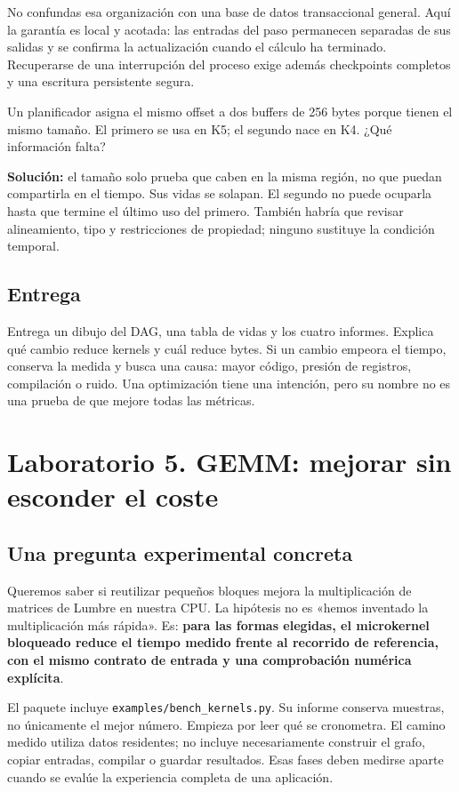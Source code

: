 \documentclass[12pt,a4paper,oneside]{report}
\begin{document}
No confundas esa organización con una base de datos transaccional general. Aquí la garantía es local y acotada: las entradas del paso permanecen separadas de sus salidas y se confirma la actualización cuando el cálculo ha terminado. Recuperarse de una interrupción del proceso exige además checkpoints completos y una escritura persistente segura.

\begin{practica}
Un planificador asigna el mismo offset a dos buffers de 256 bytes porque tienen el mismo tamaño. El primero se usa en K5; el segundo nace en K4. ¿Qué información falta?

\textbf{Solución:} el tamaño solo prueba que caben en la misma región, no que puedan compartirla en el tiempo. Sus vidas se solapan. El segundo no puede ocuparla hasta que termine el último uso del primero. También habría que revisar alineamiento, tipo y restricciones de propiedad; ninguno sustituye la condición temporal.

\end{practica}
\section{Entrega}
Entrega un dibujo del DAG, una tabla de vidas y los cuatro informes. Explica qué cambio reduce kernels y cuál reduce bytes. Si un cambio empeora el tiempo, conserva la medida y busca una causa: mayor código, presión de registros, compilación o ruido. Una optimización tiene una intención, pero su nombre no es una prueba de que mejore todas las métricas.


\chapter{Laboratorio 5. GEMM: mejorar sin esconder el coste}
\label{lab:cinco}
\section{Una pregunta experimental concreta}
Queremos saber si reutilizar pequeños bloques mejora la multiplicación de matrices de Lumbre en nuestra CPU. La hipótesis no es «hemos inventado la multiplicación más rápida». Es: \textbf{para las formas elegidas, el microkernel bloqueado reduce el tiempo medido frente al recorrido de referencia, con el mismo contrato de entrada y una comprobación numérica explícita}.

El paquete incluye \texttt{examples/ben\allowbreak{}ch\_kernels.p\allowbreak{}y}. Su informe conserva muestras, no únicamente el mejor número. Empieza por leer qué se cronometra. El camino medido utiliza datos residentes; no incluye necesariamente construir el grafo, copiar entradas, compilar o guardar resultados. Esas fases deben medirse aparte cuando se evalúe la experiencia completa de una aplicación.
\end{document}
